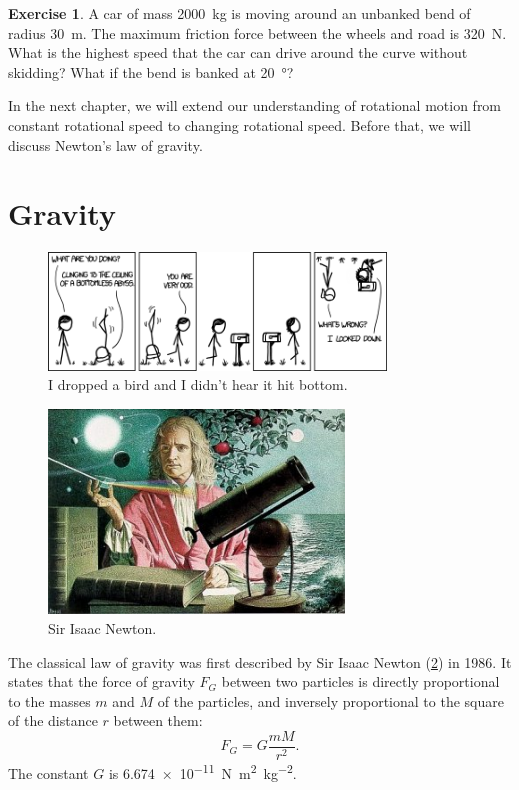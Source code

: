 \documentclass[a4paper]{amsbook}
\theoremstyle{definition}
\newtheorem{exercise}{Exercise}
\numberwithin{exercise}{chapter}
\numberwithin{exercise}{chapter}
\newcommand\capcite[1]{}
\begin{document}
\begin{exercise}
  A car of mass \SI{2000}{\kilo\gram} is moving around an unbanked bend of radius \SI{30}{\metre}. The maximum friction
  force between the wheels and road is \SI{320}{\newton}. What is the highest speed that the car can drive around the
  curve without skidding? What if the bend is banked at \SI{20}{\degree}?
\end{exercise}

In the next chapter, we will extend our understanding of rotational motion from constant rotational speed
to changing rotational speed. Before that, we will discuss Newton's law of gravity.

\section{Gravity}
\begin{figure}
  \centering
  \includegraphics[width=0.8\textwidth]{sky}
  \caption{I dropped a bird and I didn't hear it hit bottom. \capcite{https://xkcd.com/1115/}\label{fig:sky}}
\end{figure}
\begin{figure}
  \centering
  \includegraphics[width=0.7\textwidth]{newton}
  \caption{Sir Isaac Newton. \capcite{http://teachertech.rice.edu/Participants/louviere/Newton/newton5.jpg}\label{fig:newton}}
\end{figure}
The classical law of gravity was first described by Sir Isaac Newton (\cref{fig:newton}) in 1986. It states that the force of
gravity $ F_G $ between two particles is directly proportional to the masses $ m $ and $ M $ of the particles, and inversely
proportional to the square of the distance $ r $ between them:
\begin{equation}
  F_G = G\frac{mM}{r^2}.
\end{equation}
The constant $ G $ is \SI{6.674e-11}{\newton\metre\squared\per\kilo\gram\squared}.
\end{document}
